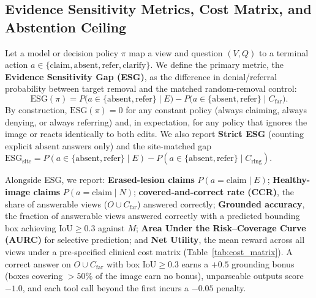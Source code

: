 \documentclass{article} %
\begin{document}
\subsection{Evidence Sensitivity Metrics, Cost Matrix, and Abstention Ceiling}
\label{subsec:method_metrics}
Let a model or decision policy $\pi$ map a view and question $(V, Q)$ to a terminal action $a \in \{\text{claim}, \text{absent}, \text{refer}, \text{clarify}\}$. We define the primary metric, the \textbf{Evidence Sensitivity Gap (ESG)}, as the difference in denial/referral probability between target removal and the matched random-removal control:
\begin{equation}
\label{eq:esg}
\text{ESG}(\pi) = P\big(a \in \{\text{absent}, \text{refer}\} \mid E\big) - P\big(a \in \{\text{absent}, \text{refer}\} \mid C_{\text{far}}\big).
\end{equation}
By construction, $\text{ESG}(\pi) = 0$ for any constant policy (always claiming, always denying, or always referring) and, in expectation, for any policy that ignores the image or reacts identically to both edits. We also report \textbf{Strict ESG} (counting explicit $\text{absent}$ answers only) and the site-matched gap $\text{ESG}_{\text{site}} = P(a \in \{\text{absent}, \text{refer}\} \mid E) - P(a \in \{\text{absent}, \text{refer}\} \mid C_{\text{ring}})$.

Alongside ESG, we report: \textbf{Erased-lesion claims} $P(a = \text{claim} \mid E)$; \textbf{Healthy-image claims} $P(a = \text{claim} \mid N)$; \textbf{covered-and-correct rate (CCR)}, the share of answerable views ($O \cup C_{\text{far}}$) answered correctly; \textbf{Grounded accuracy}, the fraction of answerable views answered correctly with a predicted bounding box achieving $\text{IoU} \ge 0.3$ against $M$; \textbf{Area Under the Risk--Coverage Curve (AURC)} \citep{geifman2017selective} for selective prediction; and \textbf{Net Utility}, the mean reward across all views under a pre-specified clinical cost matrix (Table~\ref{tab:cost_matrix}). A correct answer on $O \cup C_{\text{far}}$ with box $\text{IoU} \ge 0.3$ earns a $+0.5$ grounding bonus (boxes covering $>50\%$ of the image earn no bonus), unparseable outputs score $-1.0$, and each tool call beyond the first incurs a $-0.05$ penalty.
\end{document}
